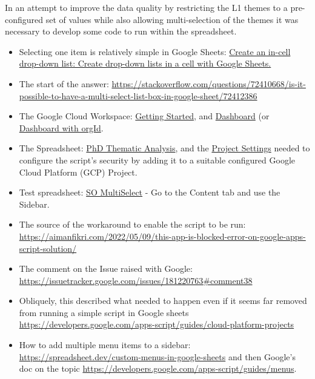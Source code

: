 In an attempt to improve the data quality by restricting the L1 themes to a pre-configured set of values while also allowing multi-selection of the themes it was necessary to develop some code to run within the spreadsheet.

\begin{itemize}
    \item Selecting one item is relatively simple in Google Sheets: \href{https://support.google.com/docs/answer/186103}{Create an in-cell drop-down list: Create drop-down lists in a cell with Google Sheets.}
    \item The start of the answer: \url{https://stackoverflow.com/questions/72410668/is-it-possible-to-have-a-multi-select-list-box-in-google-sheet/72412386}
    \item The Google Cloud Workspace: \href{https://console.cloud.google.com/getting-started?project=multi-select-spreadsheet}{Getting Started}, and \href{https://console.cloud.google.com/home/dashboard?project=multi-select-spreadsheet}{Dashboard} (or \href{https://console.cloud.google.com/home/dashboard?organizationId=0&project=multi-select-spreadsheet}{Dashboard with orgId}.
    \item The Spreadsheet: \href{https://docs.google.com/spreadsheets/d/1AIIAPWyy8Sx7rEBOx6KlZspoaS7pRUEneQgDTgXZwWI/edit#gid=397772862}{PhD Thematic Analysis}, and the \href{https://script.google.com/home/projects/101Q5upPmS1VAt1c2pXfpWn82QYI_dUg_94XfiHN1IrXmADGg2EQ9-AFG/settings}{Project Settings} needed to configure the script's security by adding it to a suitable configured Google Cloud Platform (GCP) Project.
    \item Test spreadsheet: \href{https://docs.google.com/spreadsheets/d/100M3MkhsQr0Fj-Ly2OCnnz6nzfVS32EVBH_GD7kuvRs/edit}{SO MultiSelect} - Go to the Content tab and use the Sidebar.
    \item The source of the workaround to enable the script to be run: \url{https://aimanfikri.com/2022/05/09/this-app-is-blocked-error-on-google-apps-script-solution/}
    \item The comment on the Issue raised with Google: \url{https://issuetracker.google.com/issues/181220763\#comment38}
    \item Obliquely, this described what needed to happen even if it seems far removed from running a simple script in Google sheets \url{https://developers.google.com/apps-script/guides/cloud-platform-projects}
    \item How to add multiple menu items to a sidebar: \url{https://spreadsheet.dev/custom-menus-in-google-sheets} and then Google's doc on the topic \url{https://developers.google.com/apps-script/guides/menus}.
\end{itemize}

